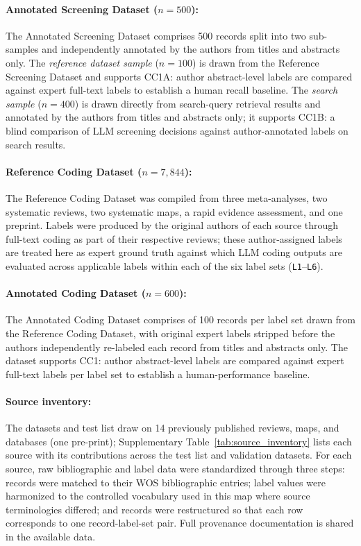 \documentclass[12pt]{article}
\begin{document}
\paragraph*{Annotated Screening Dataset ($n = 500$):} 
The Annotated Screening Dataset comprises 500 records split into two
sub-samples and independently annotated by the authors from titles and
abstracts only. The \emph{reference dataset sample} ($n = 100$) is drawn from the Reference Screening Dataset and supports CC1A: author abstract-level
labels are compared against expert full-text labels to establish a
human recall baseline. The \emph{search sample} ($n = 400$) is drawn directly from search-query retrieval results and annotated by the authors from titles and abstracts only; it supports CC1B: a blind comparison of LLM screening decisions against author-annotated labels on search results.

\paragraph*{Reference Coding Dataset ($n = 7{,}844$):}
The Reference Coding Dataset was compiled from three meta-analyses, two systematic reviews, two systematic maps, a rapid evidence assessment, and one preprint. Labels were produced by the original authors of each source through full-text coding as part of their respective reviews; these author-assigned labels are treated here as expert ground truth against which LLM coding outputs are evaluated across applicable labels within each of the six label sets (\texttt{L1}--\texttt{L6}).

\paragraph*{Annotated Coding Dataset ($n = 600$):}
The Annotated Coding Dataset comprises of 100 records per label set drawn from the Reference Coding Dataset, with original expert labels stripped before the authors independently re-labeled each record from titles and abstracts only. The dataset supports CC1: author abstract-level labels are compared against expert full-text labels per label set to establish a human-performance baseline.

\paragraph*{Source inventory:}
The datasets and test list draw on 14 previously published reviews, maps, and databases (one pre-print); Supplementary Table~\ref{tab:source_inventory} lists each source with its contributions across the test list and validation datasets. For each source, raw bibliographic and label data were standardized through three steps: records were matched to their WOS bibliographic entries; label values were harmonized to the controlled vocabulary used in this map where source terminologies differed; and records were restructured so that each row corresponds to one record-label-set pair. Full provenance documentation is shared in the available data.
\end{document}
